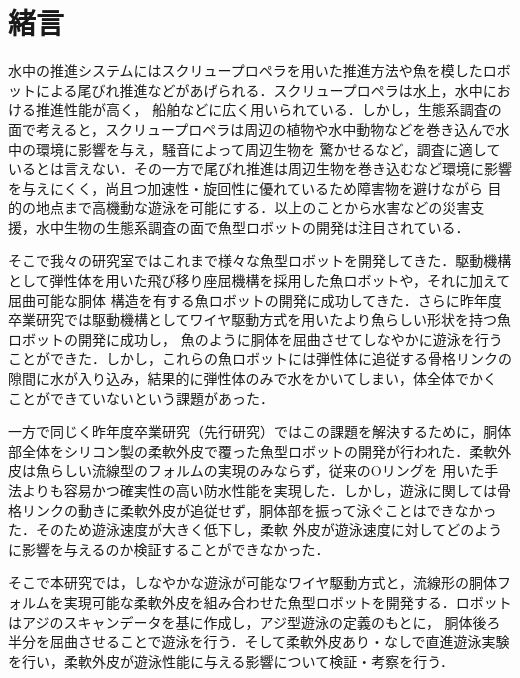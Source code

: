 \newpage
\setcounter{page}{1}
\section{緒言}
水中の推進システムにはスクリュープロペラを用いた推進方法や魚を模したロボットによる尾びれ推進などがあげられる\cite{ichi}．スクリュープロペラは水上，水中における推進性能が高く，
船舶などに広く用いられている．しかし，生態系調査の面で考えると，スクリュープロペラは周辺の植物や水中動物などを巻き込んで水中の環境に影響を与え，騒音によって周辺生物を
驚かせるなど，調査に適しているとは言えない．その一方で尾びれ推進は周辺生物を巻き込むなど環境に影響を与えにくく，尚且つ加速性・旋回性に優れているため障害物を避けながら
目的の地点まで高機動な遊泳を可能にする．以上のことから水害などの災害支援，水中生物の生態系調査の面で魚型ロボットの開発は注目されている\cite{ni}\cite{san}．

そこで我々の研究室ではこれまで様々な魚型ロボットを開発してきた．駆動機構として弾性体を用いた飛び移り座屈機構を採用した魚ロボット\cite{yon}\cite{go}や，それに加えて屈曲可能な胴体
構造を有する魚ロボット\cite{roku,nana,hachi}の開発に成功してきた．さらに昨年度卒業研究では駆動機構としてワイヤ駆動方式を用いたより魚らしい形状を持つ魚ロボットの開発に成功し，
魚のように胴体を屈曲させてしなやかに遊泳を行うことができた．しかし，これらの魚ロボットには弾性体に追従する骨格リンクの隙間に水が入り込み，結果的に弾性体のみで水をかいてしまい，体全体でかく
ことができていないという課題があった．

一方で同じく昨年度卒業研究（先行研究\cite{kyu}）ではこの課題を解決するために，胴体部全体をシリコン製の柔軟外皮で覆った魚型ロボットの開発が行われた．柔軟外皮は魚らしい流線型のフォルムの実現のみならず，従来のOリングを
用いた手法よりも容易かつ確実性の高い防水性能を実現した．しかし，遊泳に関しては骨格リンクの動きに柔軟外皮が追従せず，胴体部を振って泳ぐことはできなかった．そのため遊泳速度が大きく低下し，柔軟
外皮が遊泳速度に対してどのように影響を与えるのか検証することができなかった．

そこで本研究では，しなやかな遊泳が可能なワイヤ駆動方式と，流線形の胴体フォルムを実現可能な柔軟外皮を組み合わせた魚型ロボットを開発する．ロボットはアジのスキャンデータを基に作成し，アジ型遊泳の定義\cite{juu}のもとに，
胴体後ろ半分を屈曲させることで遊泳を行う．そして柔軟外皮あり・なしで直進遊泳実験を行い，柔軟外皮が遊泳性能に与える影響について検証・考察を行う．
